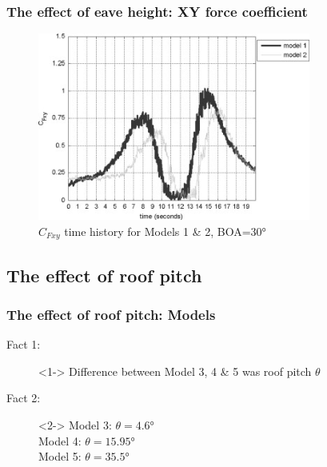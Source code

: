 \documentclass{beamer}
\begin{document}
\begin{frame}
	\frametitle{The effect of eave height: XY force coefficient}
	\begin{figure}
			\includegraphics[width=0.8\textwidth]{./fig/6.jpg}
			\caption{$C_{Fxy}$ time history for Models 1 \& 2, BOA=\ang{30}}
		\end{figure}
\end{frame}

\subsection{The effect of roof pitch}
\begin{frame}
	\frametitle{The effect of roof pitch: Models}
	\begin{description}
		\item[Fact 1: ]<1-> Difference between Model 3, 4  \& 5 was \alert{roof pitch $\theta$}
		\item[Fact 2: ]<2-> Model 3:  $\theta=\ang{4.6}$ \\
		                                         Model 4:  $\theta=\ang{15.95}$ \\
		                                         Model 5:  $\theta=\ang{35.5}$
	\end{description}
\end{frame}
\end{document}
